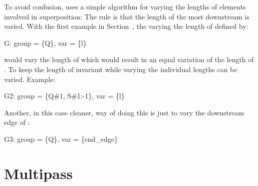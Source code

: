 To avoid confusion, \bmad uses a simple algorithm for varying the
lengths of elements involved in superposition: The rule is that the
length of the most downstream  is varied.
With the first example in Section~, the  
varying the length of  defined by:
\begin{example}
  G: group = \{Q\}, var = \{l\}
\end{example}
would vary the length of  which would result in an equal
variation of the length of . To keep the length of 
invariant while varying  the individual  lengths
can be varied. Example:
\begin{example}
  G2: group = \{Q{\#}1, S{\#}1:-1\}, var = \{l\}
\end{example}
Another, in this case cleaner, way of doing this is just to vary the
downstream edge of :
\begin{example}
  G3: group = \{Q\}, var = \{end_edge\}
\end{example}

\section{Multipass}
\label{s:multipass}

